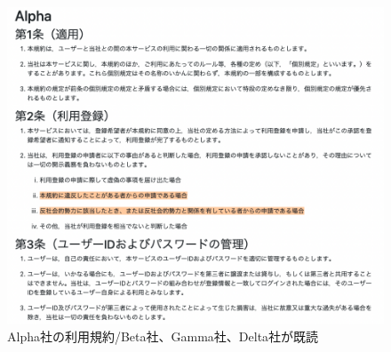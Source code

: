 \begin{figure}[h]
  \begin{center}
      \includegraphics[width=16cm]{img/alpha_bgd.png}
      \caption{Alpha社の利用規約/Beta社、Gamma社、Delta社が既読}
      \label{img:Alpha社の利用規約/Beta社、Gamma社、Delta社が既読}
  \end{center}
\end{figure}

